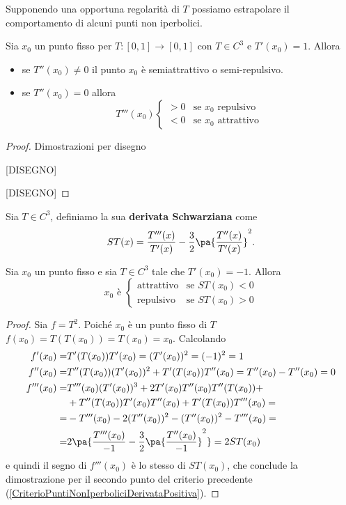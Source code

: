 Supponendo una opportuna regolarit\`a di $T$ possiamo estrapolare il comportamento di alcuni punti non iperbolici. 
\begin{proposition}\label{CriterioPuntiNonIperboliciDerivataPositiva}
Sia $x_0$ un punto fisso per $T:[0,1]\to[0,1]$ con $T\in C^3$ e $T'(x_0)=1$. Allora
\begin{itemize}
\item se $T''(x_0)\neq 0$ il punto $x_0$ \`e semiattrattivo o semi-repulsivo.
\item se $T''(x_0)=0$ allora
\[T'''(x_0)\begin{cases}
>0 & \text{se }x_0\text{ repulsivo}\\
<0 & \text{se }x_0\text{ attrattivo}
\end{cases}\]
\end{itemize}
\end{proposition}
\begin{proof}
Dimostrazioni per disegno
	
[DISEGNO]

[DISEGNO]
\end{proof}
	
\begin{definition}
Sia $T\in C^3$, definiamo la sua \textbf{derivata Schwarziana} come
\[ST(x)=\frac{T'''(x)}{T'(x)}-\frac32\pa{\frac{T''(x)}{T'(x)}}^2.\]
\end{definition}
\begin{proposition}\label{CriterioPuntiNonIperboliciDerivataNegativa}
Sia $x_0$ un punto fisso e sia $T\in C^3$ tale che $T'(x_0)=-1$. Allora
\[x_0\text{ \`e }\begin{cases}
\text{attrattivo} &\text{se }ST(x_0)<0\\
\text{repulsivo} &\text{se }ST(x_0)>0
\end{cases}\]
\end{proposition}
\begin{proof}
Sia $f=T^2$. Poich\'e $x_0$ \`e un punto fisso di $T$ $f(x_0)=T(T(x_0))=T(x_0)=x_0$. Calcolando
\begin{align*}
	f'(x_0)=&T'(T(x_0))T'(x_0)=(T'(x_0))^2=(-1)^2=1\\
	f''(x_0)=&T''(T(x_0))(T'(x_0))^2+T'(T(x_0))T''(x_0)=T''(x_0)-T''(x_0)=0\\
	f'''(x_0)=&T'''(x_0)(T'(x_0))^3+2T'(x_0)T''(x_0)T''(T(x_0))+\\
	&+T''(T(x_0))T'(x_0)T''(x_0)+T'(T(x_0))T'''(x_0)=\\
	=&-T'''(x_0)-2(T''(x_0))^2-(T''(x_0))^2-T'''(x_0)=\\
	=&2\pa{\frac{T'''(x_0)}{-1}-\frac32\pa{\frac{T''(x_0)}{-1}}^2}=2ST(x_0)
\end{align*}
e quindi il segno di $f'''(x_0)$ \`e lo stesso di $ST(x_0)$, che conclude la dimostrazione per il secondo punto del criterio precedente (\ref{CriterioPuntiNonIperboliciDerivataPositiva}).
\end{proof}

